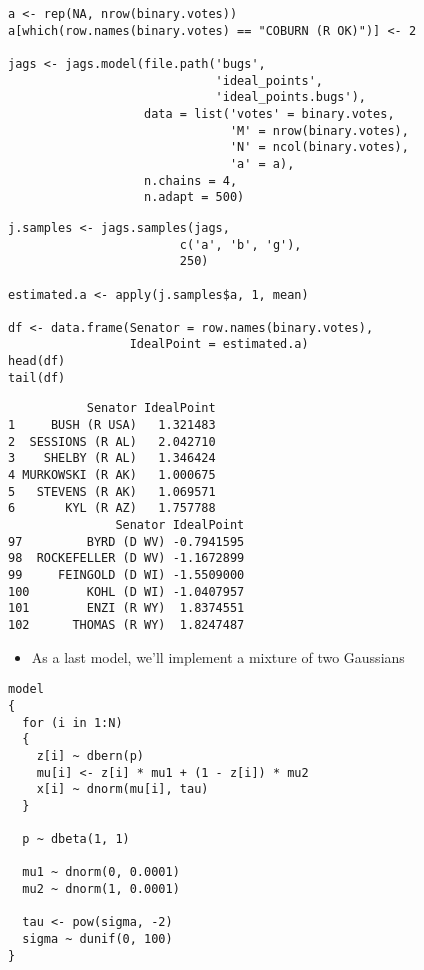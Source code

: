 \documentclass{beamer}
\begin{document}
\begin{frame}[fragile]
  \begin{verbatim}
a <- rep(NA, nrow(binary.votes))
a[which(row.names(binary.votes) == "COBURN (R OK)")] <- 2

jags <- jags.model(file.path('bugs',
                             'ideal_points',
                             'ideal_points.bugs'),
                   data = list('votes' = binary.votes,
                               'M' = nrow(binary.votes),
                               'N' = ncol(binary.votes),
                               'a' = a),
                   n.chains = 4,
                   n.adapt = 500)
  \end{verbatim}
\end{frame}

\begin{frame}[fragile]
  \begin{verbatim}
j.samples <- jags.samples(jags,
                        c('a', 'b', 'g'),
                        250)

estimated.a <- apply(j.samples$a, 1, mean)

df <- data.frame(Senator = row.names(binary.votes),
                 IdealPoint = estimated.a)
head(df)
tail(df)
  \end{verbatim}
\end{frame}

\begin{frame}[fragile]
  \begin{verbatim}
           Senator IdealPoint
1     BUSH (R USA)   1.321483
2  SESSIONS (R AL)   2.042710
3    SHELBY (R AL)   1.346424
4 MURKOWSKI (R AK)   1.000675
5   STEVENS (R AK)   1.069571
6       KYL (R AZ)   1.757788
               Senator IdealPoint
97         BYRD (D WV) -0.7941595
98  ROCKEFELLER (D WV) -1.1672899
99     FEINGOLD (D WI) -1.5509000
100        KOHL (D WI) -1.0407957
101        ENZI (R WY)  1.8374551
102      THOMAS (R WY)  1.8247487
  \end{verbatim}
\end{frame}

\begin{frame}[fragile]
  \begin{itemize}
    \item{As a last model, we'll implement a mixture of two Gaussians}
  \end{itemize}
\end{frame}

\begin{frame}[fragile]
  \begin{verbatim}
model
{
  for (i in 1:N)
  {
    z[i] ~ dbern(p)
    mu[i] <- z[i] * mu1 + (1 - z[i]) * mu2
    x[i] ~ dnorm(mu[i], tau)
  }
  
  p ~ dbeta(1, 1)
  
  mu1 ~ dnorm(0, 0.0001)
  mu2 ~ dnorm(1, 0.0001)
  
  tau <- pow(sigma, -2)
  sigma ~ dunif(0, 100)
}
  \end{verbatim}
\end{frame}
\end{document}
